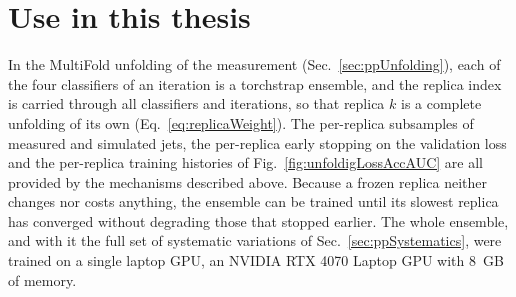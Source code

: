 \section{Use in this thesis}
\label{sec:tsUse}
In the MultiFold unfolding of the \pp measurement (Sec.~\ref{sec:ppUnfolding}), each of the four classifiers of an iteration is a torchstrap ensemble, and the replica index is carried through all classifiers and iterations, so that replica \(k\) is a complete unfolding of its own (Eq.~\ref{eq:replicaWeight}).
%
The per-replica subsamples of measured and simulated jets, the per-replica early stopping on the validation loss and the per-replica training histories of Fig.~\ref{fig:unfoldigLossAccAUC} are all provided by the mechanisms described above.
%
Because a frozen replica neither changes nor costs anything, the ensemble can be trained until its slowest replica has converged without degrading those that stopped earlier.
%
The whole ensemble, and with it the full set of systematic variations of Sec.~\ref{sec:ppSystematics}, were trained on a single laptop GPU, an NVIDIA RTX 4070 Laptop GPU with 8~GB of memory.

